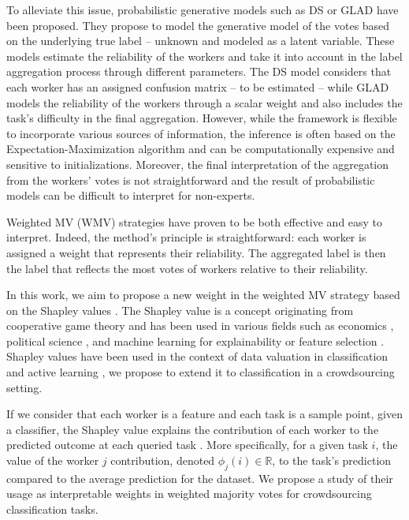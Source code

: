 \documentclass{cap2024}
\begin{document}
To alleviate this issue, probabilistic generative models such as DS \citep{dawid_maximum_1979} or GLAD \citep{whitehill_whose_2009} have been proposed.
They propose to model the generative model of the votes based on the underlying true label -- unknown and modeled as a latent variable.
These models estimate the reliability of the workers and take it into account in the label aggregation process through different parameters. The DS model considers that each worker has an assigned confusion matrix -- to be estimated -- while GLAD models the reliability of the workers through a scalar weight and also includes the task's difficulty in the final aggregation.
However, while the framework is flexible to incorporate various sources of information, the inference is often based on the Expectation-Maximization algorithm and can be computationally expensive and sensitive to initializations.
Moreover, the final interpretation of the aggregation from the workers' votes is not straightforward and the result of probabilistic models can be difficult to interpret for non-experts.

Weighted MV (WMV) strategies \citep{appen_wawa_2021,karger2011iterative,ma2020adversarial} have proven to be both effective and easy to interpret. Indeed, the method's principle is straightforward: each worker is assigned a weight that represents their reliability. The aggregated label is then the label that reflects the most votes of workers relative to their reliability.

In this work, we aim to propose a new weight in the weighted MV strategy based on the Shapley values \citep{shapley1953value}.
The Shapley value is a concept originating from cooperative game theory and has been used in various fields such as economics \citep{aumann1994economic}, political science \citep{engelbrecht2009use}, and machine learning for explainability \citep{lundberg2017unified} or feature selection \citep{cohen2007feature}.
Shapley values have been used in the context of data valuation in classification \citep{schoch2022cs} and active learning \citep{ghorbani2022data}, we propose to extend it to classification in a crowdsourcing setting.

If we consider that each worker is a feature and each task is a sample point, given a classifier, the Shapley value explains the contribution of each worker to the predicted outcome at each queried task \citep{molnar2020interpretable}.
More specifically, for a given task $i$, the value of the worker $j$ contribution, denoted $\phi_j(i)\in\mathbb{R}$, to the task's prediction compared to the average prediction for the dataset.
We propose a study of their usage as interpretable weights in weighted majority votes for crowdsourcing classification tasks.
\end{document}
